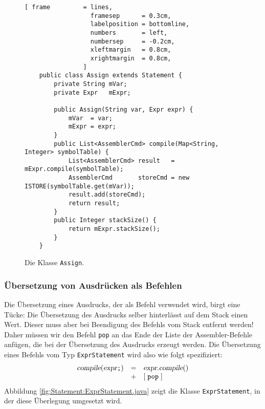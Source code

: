 \begin{figure}[!ht]
\centering
\begin{Verbatim}[ frame         = lines, 
                  framesep      = 0.3cm, 
                  labelposition = bottomline,
                  numbers       = left,
                  numbersep     = -0.2cm,
                  xleftmargin   = 0.8cm,
                  xrightmargin  = 0.8cm,
                ]
    public class Assign extends Statement {
        private String mVar;
        private Expr   mExpr;
    
        public Assign(String var, Expr expr) {
            mVar  = var;
            mExpr = expr;
        }
        public List<AssemblerCmd> compile(Map<String, Integer> symbolTable) {
            List<AssemblerCmd> result   = mExpr.compile(symbolTable);
            AssemblerCmd       storeCmd = new ISTORE(symbolTable.get(mVar));
            result.add(storeCmd);
            return result;
        }
        public Integer stackSize() {
            return mExpr.stackSize();
        }    
    }
\end{Verbatim}
\vspace*{-0.3cm}
\caption{Die Klasse \texttt{Assign}.}
\label{fig:Statement:Assign.java}
\end{figure}

\subsubsection{\"Ubersetzung von Ausdr\"ucken als Befehlen}
Die \"Ubersetzung eines Ausdrucks, der als Befehl verwendet wird, birgt eine T\"ucke:
Die \"Ubersetzung des Ausdrucks selber hinterl\"asst auf dem Stack einen Wert.  Dieser muss aber bei
Beendigung des Befehls vom Stack entfernt werden!  Daher m\"ussen wir den Befehl \texttt{pop} an das
Ende der Liste der Assembler-Befehle anf\"ugen, die bei der \"Ubersetzung des Ausdrucks erzeugt werden.
Die \"Ubersetzung eines  Befehls vom Typ \texttt{ExprStatement} wird also
wie folgt spezifiziert:
\[
   \begin{array}[t]{lcl}
   \textsl{compile}(\textsl{expr}\texttt{;}) & = & 
         \textsl{expr}.\textsl{compile}()  \\
   & + & [\;\texttt{pop}\;]  
\end{array}
\]
Abbildung \ref{fig:Statement:ExprStatement.java} zeigt die Klasse \texttt{ExprStatement}, in der
diese \"Uberlegung umgesetzt wird.

